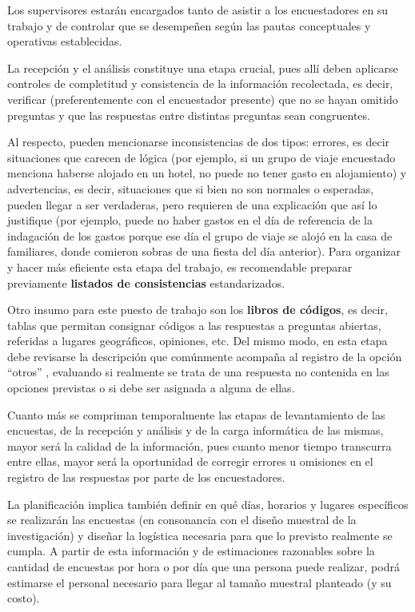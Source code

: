 \documentclass[
]{book}
\begin{document}
Los supervisores estarán encargados tanto de asistir a los encuestadores en su trabajo y de controlar que se desempeñen según las pautas conceptuales y operativas establecidas.

La recepción y el análisis constituye una etapa crucial, pues allí deben aplicarse controles de completitud y consistencia de la información recolectada, es decir, verificar (preferentemente con el encuestador presente) que no se hayan omitido preguntas y que las respuestas entre distintas preguntas sean congruentes.

Al respecto, pueden mencionarse inconsistencias de dos tipos: errores, es decir situaciones que carecen de lógica (por ejemplo, si un grupo de viaje encuestado menciona haberse alojado en un hotel, no puede no tener gasto en alojamiento) y advertencias, es decir, situaciones que si bien no son normales o esperadas, pueden llegar a ser verdaderas, pero requieren de una explicación que así lo justifique (por ejemplo, puede no haber gastos en el día de referencia de la indagación de los gastos porque ese día el grupo de viaje se alojó en la casa de familiares, donde comieron sobras de una fiesta del día anterior). Para organizar y hacer más eficiente esta etapa del trabajo, es recomendable preparar previamente \textbf{listados de consistencias} estandarizados.

Otro insumo para este puesto de trabajo son los \textbf{libros de códigos}, es decir, tablas que permitan consignar códigos a las respuestas a preguntas abiertas, referidas a lugares geográficos, opiniones, etc. Del mismo modo, en esta etapa debe revisarse la descripción que comúnmente acompaña al registro de la opción ``otros'' , evaluando si realmente se trata de una respuesta no contenida en las opciones previstas o si debe ser asignada a alguna de ellas.

Cuanto más se compriman temporalmente las etapas de levantamiento de las encuestas, de la recepción y análisis y de la carga informática de las mismas, mayor será la calidad de la información, pues cuanto menor tiempo transcurra entre ellas, mayor será la oportunidad de corregir errores u omisiones en el registro de las respuestas por parte de los encuestadores.

La planificación implica también definir en qué días, horarios y lugares específicos se realizarán las encuestas (en consonancia con el diseño muestral de la investigación) y diseñar la logística necesaria para que lo previsto realmente se cumpla. A partir de esta información y de estimaciones razonables sobre la cantidad de encuestas por hora o por día que una persona puede realizar, podrá estimarse el personal necesario para llegar al tamaño muestral planteado (y su costo).
\end{document}
